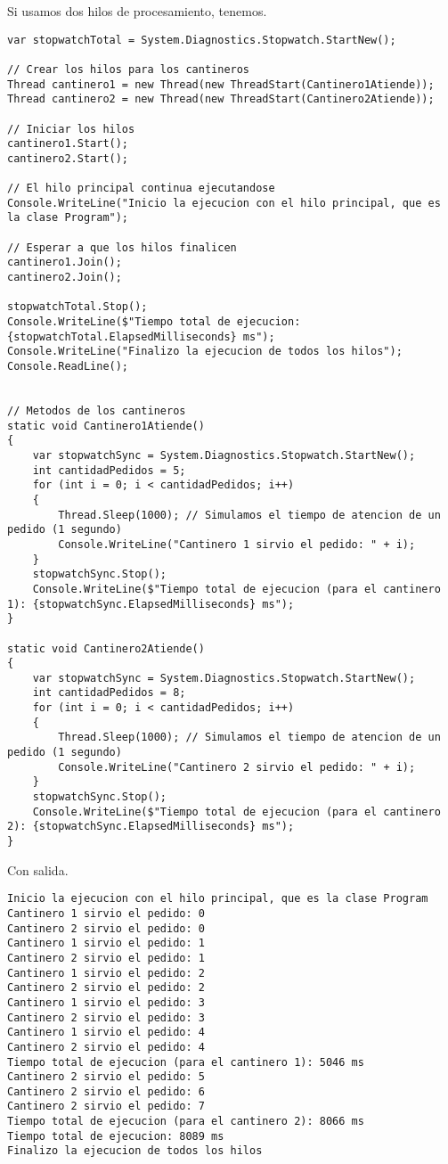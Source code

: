 \documentclass[executivepaper]{article}
\begin{document}
Si usamos dos hilos de procesamiento, tenemos.

\begin{lstlisting}
var stopwatchTotal = System.Diagnostics.Stopwatch.StartNew();

// Crear los hilos para los cantineros
Thread cantinero1 = new Thread(new ThreadStart(Cantinero1Atiende));
Thread cantinero2 = new Thread(new ThreadStart(Cantinero2Atiende));

// Iniciar los hilos
cantinero1.Start();
cantinero2.Start();

// El hilo principal continua ejecutandose
Console.WriteLine("Inicio la ejecucion con el hilo principal, que es la clase Program");

// Esperar a que los hilos finalicen
cantinero1.Join();
cantinero2.Join();

stopwatchTotal.Stop();
Console.WriteLine($"Tiempo total de ejecucion: {stopwatchTotal.ElapsedMilliseconds} ms");
Console.WriteLine("Finalizo la ejecucion de todos los hilos");
Console.ReadLine();


// Metodos de los cantineros
static void Cantinero1Atiende()
{
    var stopwatchSync = System.Diagnostics.Stopwatch.StartNew();
    int cantidadPedidos = 5;
    for (int i = 0; i < cantidadPedidos; i++)
    {
        Thread.Sleep(1000); // Simulamos el tiempo de atencion de un pedido (1 segundo)
        Console.WriteLine("Cantinero 1 sirvio el pedido: " + i);
    }
    stopwatchSync.Stop();
    Console.WriteLine($"Tiempo total de ejecucion (para el cantinero 1): {stopwatchSync.ElapsedMilliseconds} ms");
}

static void Cantinero2Atiende()
{
    var stopwatchSync = System.Diagnostics.Stopwatch.StartNew();
    int cantidadPedidos = 8;
    for (int i = 0; i < cantidadPedidos; i++)
    {
        Thread.Sleep(1000); // Simulamos el tiempo de atencion de un pedido (1 segundo)
        Console.WriteLine("Cantinero 2 sirvio el pedido: " + i);
    }
    stopwatchSync.Stop();
    Console.WriteLine($"Tiempo total de ejecucion (para el cantinero 2): {stopwatchSync.ElapsedMilliseconds} ms");
}    
\end{lstlisting}

Con salida.

\begin{verbatim}
Inicio la ejecucion con el hilo principal, que es la clase Program
Cantinero 1 sirvio el pedido: 0
Cantinero 2 sirvio el pedido: 0
Cantinero 1 sirvio el pedido: 1
Cantinero 2 sirvio el pedido: 1
Cantinero 1 sirvio el pedido: 2
Cantinero 2 sirvio el pedido: 2
Cantinero 1 sirvio el pedido: 3
Cantinero 2 sirvio el pedido: 3
Cantinero 1 sirvio el pedido: 4
Cantinero 2 sirvio el pedido: 4
Tiempo total de ejecucion (para el cantinero 1): 5046 ms
Cantinero 2 sirvio el pedido: 5
Cantinero 2 sirvio el pedido: 6
Cantinero 2 sirvio el pedido: 7
Tiempo total de ejecucion (para el cantinero 2): 8066 ms
Tiempo total de ejecucion: 8089 ms
Finalizo la ejecucion de todos los hilos
\end{verbatim}
\end{document}
